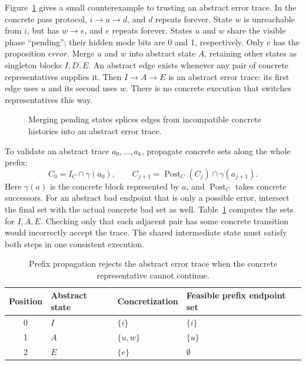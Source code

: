 Figure~\ref{fig:ch46-abstraction} gives a small counterexample to trusting an abstract error trace.
In the concrete pass protocol, $i\to u\to d$, and $d$ repeats forever.
State $w$ is unreachable from $i$, but has $w\to e$, and $e$ repeats forever.
States $u$ and $w$ share the visible phase \enquote{pending}; their hidden mode bits are 0 and 1, respectively.
Only $e$ has the proposition $\mathit{error}$.
Merge $u$ and $w$ into abstract state $A$, retaining other states as singleton blocks $I,D,E$.
An abstract edge exists whenever any pair of concrete representatives supplies it.
Then $I\to A\to E$ is an abstract error trace: its first edge uses $u$ and its second uses $w$.
There is no concrete execution that switches representatives this way.

\begin{figure}[tbp]
\centering

\caption{Merging pending states splices edges from incompatible concrete histories into an abstract error trace.}
\label{fig:ch46-abstraction}
\end{figure}

To validate an abstract trace $a_0,\ldots,a_k$, propagate concrete sets along the whole prefix:
\[
 C_0=I_C\cap\gamma(a_0),\qquad
 C_{j+1}=\operatorname{Post}_C(C_j)\cap\gamma(a_{j+1}).
\]
Here $\gamma(a)$ is the concrete block represented by $a$, and $\operatorname{Post}_C$ takes concrete successors.
For an abstract bad endpoint that is only a possible error, intersect the final set with the actual concrete bad set as well.
Table~\ref{tab:ch46-spurious} computes the sets for $I,A,E$.
Checking only that each adjacent pair has some concrete transition would incorrectly accept the trace.
The shared intermediate state must satisfy both steps in one consistent execution.

\begin{table}[tbp]
\centering
\caption{Prefix propagation rejects the abstract error trace when the concrete representative cannot continue.}
\label{tab:ch46-spurious}
\begin{tabular}{clll}
\toprule
Position & Abstract state & Concretization & Feasible prefix endpoint set \\
\midrule
0 & $I$ & $\{i\}$ & $\{i\}$ \\
1 & $A$ & $\{u,w\}$ & $\{u\}$ \\
2 & $E$ & $\{e\}$ & $\emptyset$ \\
\bottomrule
\end{tabular}
\end{table}

